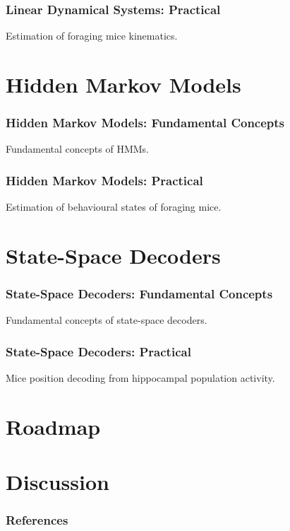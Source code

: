 \documentclass{beamer}
\begin{document}
\begin{frame}
    \frametitle{Linear Dynamical Systems: Practical}

    Estimation of foraging mice kinematics.

\end{frame}

\section{Hidden Markov Models}

\begin{frame}
    \frametitle{Hidden Markov Models: Fundamental Concepts}

    Fundamental concepts of HMMs.

\end{frame}

\begin{frame}
    \frametitle{Hidden Markov Models: Practical}

    Estimation of behavioural states of foraging mice.

\end{frame}

\section{State-Space Decoders}

\begin{frame}
    \frametitle{State-Space Decoders: Fundamental Concepts}

    Fundamental concepts of state-space decoders.

\end{frame}

\begin{frame}
    \frametitle{State-Space Decoders: Practical}

    Mice position decoding from hippocampal population activity.

\end{frame}

\section{Roadmap}

\section{Discussion}



\begin{frame}
    \frametitle{References}

    \tiny{
        
        
    }
\end{frame}
\end{document}

